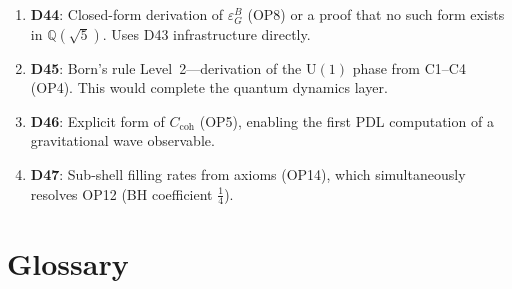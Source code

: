 \documentclass[11pt,a4paper]{article}
\theoremstyle{plain}
\theoremstyle{definition}
\theoremstyle{remark}
\newcommand{\epsGeomB}{\varepsilon_G^B}
\begin{document}
\begin{enumerate}
\item \textbf{D44}: Closed-form derivation of $\epsGeomB$ (OP8) or a proof that no such form exists in $\mathbb{Q}(\sqrt{5})$. Uses D43 infrastructure directly.
\item \textbf{D45}: Born's rule Level~2---derivation of the $\mathrm{U}(1)$ phase from C1--C4 (OP4). This would complete the quantum dynamics layer.
\item \textbf{D46}: Explicit form of $C_{\mathrm{coh}}$ (OP5), enabling the first PDL computation of a gravitational wave observable.
\item \textbf{D47}: Sub-shell filling rates from axioms (OP14), which simultaneously resolves OP12 (BH coefficient $\tfrac{1}{4}$).
\end{enumerate}

\section{Glossary}
\label{sec:glossary}
\end{document}
